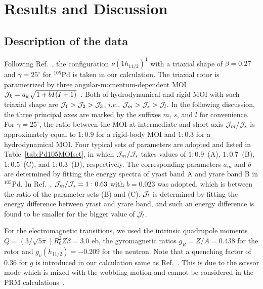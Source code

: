 \documentclass[aps,prc,preprint,showpacs,groupedaddress,floatfix,amsmath,amssymb]{revtex4-1}
\begin{document}
\section{Results and Discussion}



\subsection{Description of the data}

Following Ref.~\cite{Pd105}, the configuration $\nu (1h_{11/2})^{1}$
with a triaxial shape of $\beta=0.27$ and $\gamma=25^{\circ}$ for $^{105}$Pd is taken in our calculation.
The triaxial rotor is parametrized by three angular-momentum-dependent MOI
 ${\cal J}_{k}=a_{k}\sqrt{1+bI(I+1)}$~\cite{Pd105}.
Both of hydrodynamical and rigid MOI with such triaxial shape are ${\cal J}_{1}>{\cal J}_{2}>{\cal J}_{3}$, $i.e.$, ${\cal J}_{m}>{\cal J}_{s}>{\cal J}_{l}$. In the following discussion, the three principal axes  are marked by the suffixes $m$,  $s$, and $l$  for  convenience.
For $\gamma=25^{\circ}$, the ratio between the MOI at intermediate and short axis ${\cal J}_{m}/{\cal J}_{s}$ is approximately equal to $1:0.9$ for a rigid-body MOI and $1:0.3$ for a hydrodynamical MOI.
Four typical sets of parameters are adopted and listed in Table~\ref{tab:Pd105MOIset}, in which ${\cal J}_{m}/{\cal J}_{s}$ takes values of  $1:0.9$~(A), $1:0.7$~(B), $1:0.5$~(C), and $1:0.3$~(D), respectively. The corresponding parameters $a_m$ and $b$
are determined by fitting the energy spectra of yrast band A and yrare band B in $^{105}$Pd.
In Ref.~\cite{Pd105}, ${\cal J}_{m}/{\cal J}_{s}=1:0.63$ with $b=0.023$ was adopted, which is between the ratio of the parameter sets (B) and (C).
${\cal J}_{l}$ is determined by fitting the energy difference between yrast and yrare band, and such an energy difference is found to be smaller for the bigger value of ${\cal J}_{l}$.

For the electromagnetic transitions, we used the intrinsic
quadrupole moments $Q=(3/\sqrt{5\pi})R_{0}^{2}Z\beta=3.0$ eb,
the gyromagnetic ratios $g_{R}=Z/A=0.438$ for the rotor and $g_{\nu }(h_{11/2})=-0.209$ for the neutron.
Note that a quenching factor of $0.36$ for $g$ is introduced in our calculation same as Ref.~\cite{Pd105}. This is due to the scissor mode which is mixed with the wobbling motion and cannot be considered in the PRM calculations~\cite{Pd105}.
\end{document}
